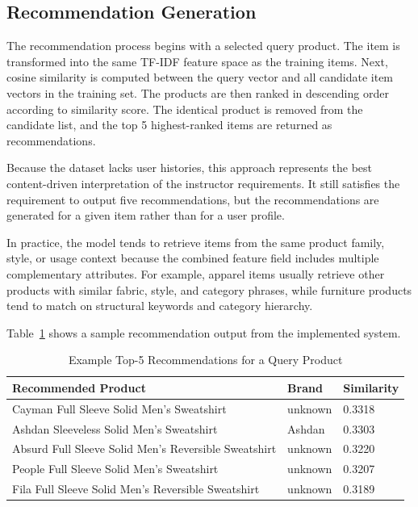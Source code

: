 \documentclass[conference]{IEEEtran}
\begin{document}
\subsection{Recommendation Generation}
The recommendation process begins with a selected query product. The item is transformed into the same TF-IDF feature space as the training items. Next, cosine similarity is computed between the query vector and all candidate item vectors in the training set. The products are then ranked in descending order according to similarity score. The identical product is removed from the candidate list, and the top 5 highest-ranked items are returned as recommendations.

Because the dataset lacks user histories, this approach represents the best content-driven interpretation of the instructor requirements. It still satisfies the requirement to output five recommendations, but the recommendations are generated for a given item rather than for a user profile.

In practice, the model tends to retrieve items from the same product family, style, or usage context because the combined feature field includes multiple complementary attributes. For example, apparel items usually retrieve other products with similar fabric, style, and category phrases, while furniture products tend to match on structural keywords and category hierarchy.

Table~\ref{tab:example_recs} shows a sample recommendation output from the implemented system.

\begin{table}[!t]
\caption{Example Top-5 Recommendations for a Query Product}
\label{tab:example_recs}
\centering
\begin{tabular}{|p{}|p{}|p{}|}
\hline
\textbf{Recommended Product} & \textbf{Brand} & \textbf{Similarity} \\
\hline
Cayman Full Sleeve Solid Men's Sweatshirt & unknown & 0.3318 \\
\hline
Ashdan Sleeveless Solid Men's Sweatshirt & Ashdan & 0.3303 \\
\hline
Absurd Full Sleeve Solid Men's Reversible Sweatshirt & unknown & 0.3220 \\
\hline
People Full Sleeve Solid Men's Sweatshirt & unknown & 0.3207 \\
\hline
Fila Full Sleeve Solid Men's Reversible Sweatshirt & unknown & 0.3189 \\
\hline
\end{tabular}
\end{table}
\end{document}
